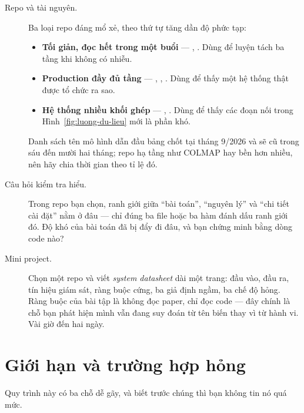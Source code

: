 \documentclass[../../deep_learning.tex]{subfiles}
\begin{document}
\begin{description}
\item[Repo và tài nguyên.] Ba loại repo đáng mổ xẻ, theo thứ tự tăng dần độ phức tạp:
  \begin{itemize}
  \item \textbf{Tối giản, đọc hết trong một buổi} --- , . Dùng để luyện tách ba tầng khi không có nhiễu.
  \item \textbf{Production đầy đủ tầng} --- , , . Dùng để thấy một hệ thống thật được tổ chức ra sao.
  \item \textbf{Hệ thống nhiều khối ghép} --- , . Dùng để thấy các đoạn nối trong Hình~\ref{fig:luong-du-lieu} mới là phần khó.
  \end{itemize}
  Danh sách tên mô hình dẫn đầu bảng chốt tại tháng 9/2026 và sẽ cũ trong sáu đến mười hai tháng; repo hạ tầng như COLMAP hay  bền hơn nhiều, nên hãy chia thời gian theo tỉ lệ đó.
\item[Câu hỏi kiểm tra hiểu.] Trong repo bạn chọn, ranh giới giữa ``bài toán'', ``nguyên lý'' và ``chi tiết cài đặt'' nằm ở đâu --- chỉ đúng ba file hoặc ba hàm đánh dấu ranh giới đó. Độ khó của bài toán đã bị đẩy đi đâu, và bạn chứng minh bằng dòng code nào?
\item[Mini project.] Chọn một repo và viết \emph{system datasheet} dài một trang: đầu vào, đầu ra, tín hiệu giám sát, ràng buộc cứng, ba giả định ngầm, ba chế độ hỏng. Ràng buộc của bài tập là không đọc paper, chỉ đọc code --- đây chính là chỗ bạn phát hiện mình vẫn đang suy đoán từ tên biến thay vì từ hành vi. Vài giờ đến hai ngày.
\end{description}

\section{Giới hạn và trường hợp hỏng}
Quy trình này có ba chỗ dễ gãy, và biết trước chúng thì bạn không tin nó quá mức.
\end{document}
